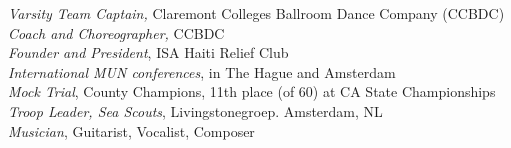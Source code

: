 \textit{Varsity Team Captain,} Claremont Colleges Ballroom Dance Company (CCBDC)  \\
\textit{Coach and Choreographer,} CCBDC\\
\textit{Founder and President}, ISA Haiti Relief Club \\
\textit{International MUN conferences}, in The Hague and Amsterdam\\
\textit{Mock Trial}, County Champions, 11th place (of 60) at CA State Championships \\
\textit{Troop Leader, Sea Scouts}, Livingstonegroep. Amsterdam, NL\\
\textit{Musician}, Guitarist, Vocalist, Composer \\
